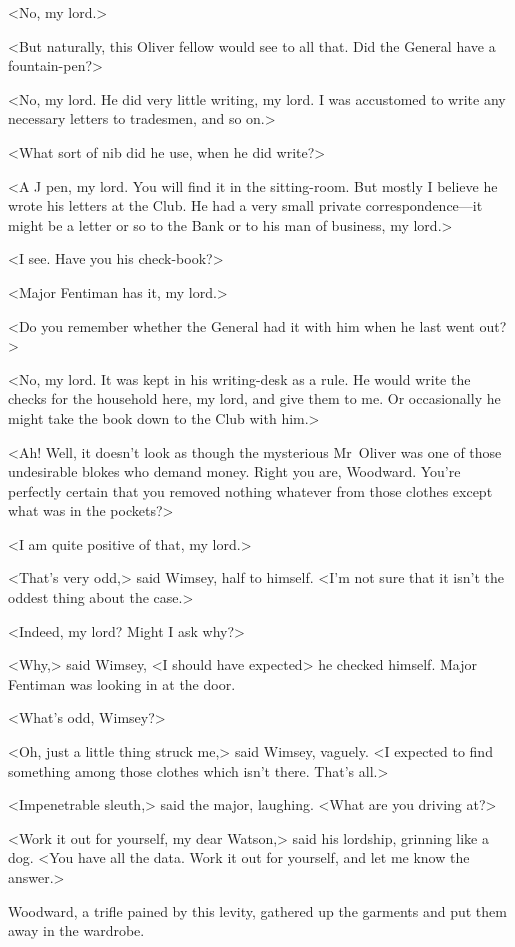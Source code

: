 <No, my lord.>

<But naturally, this Oliver fellow would see to all that. Did the General have a fountain-pen?>

<No, my lord. He did very little writing, my lord. I was accustomed to write any necessary letters to tradesmen, and so on.>

<What sort of nib did he use, when he did write?>

<A J pen, my lord. You will find it in the sitting-room. But mostly I believe he wrote his letters at the Club. He had a very small private correspondence—it might be a letter or so to the Bank or to his man of business, my lord.>

<I see. Have you his check-book?>

<Major Fentiman has it, my lord.>

<Do you remember whether the General had it with him when he last went out?>

<No, my lord. It was kept in his writing-desk as a rule. He would write the checks for the household here, my lord, and give them to me. Or occasionally he might take the book down to the Club with him.>

<Ah! Well, it doesn't look as though the mysterious Mr~Oliver was one of those undesirable blokes who demand money. Right you are, Woodward. You're perfectly certain that you removed nothing whatever from those clothes except what was in the pockets?>

<I am quite positive of that, my lord.>

<That's very odd,> said Wimsey, half to himself. <I'm not sure that it isn't the oddest thing about the case.>

<Indeed, my lord? Might I ask why?>

<Why,> said Wimsey, <I should have expected\longdash> he checked himself. Major Fentiman was looking in at the door.

<What's odd, Wimsey?>

<Oh, just a little thing struck me,> said Wimsey, vaguely. <I expected to find something among those clothes which isn't there. That's all.>

<Impenetrable sleuth,> said the major, laughing. <What are you driving at?>

<Work it out for yourself, my dear Watson,> said his lordship, grinning like a dog. <You have all the data. Work it out for yourself, and let me know the answer.>

Woodward, a trifle pained by this levity, gathered up the garments and put them away in the wardrobe.

